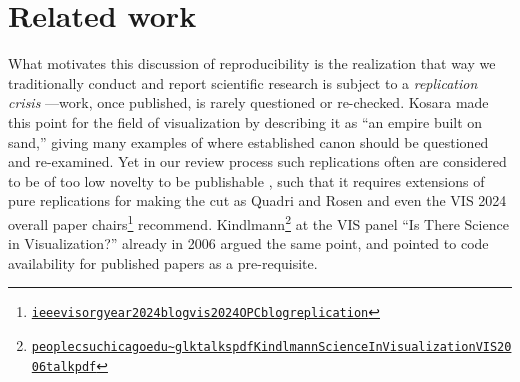 \documentclass[conference]{vgtc}                     %
\begin{document}
\section{Related work}
\label{sec:rw}

What motivates this discussion of reproducibility is the realization that way we traditionally conduct and report scientific research is subject to a \emph{replication crisis} \cite{Kosara:2018:SRC,Cockburn:2020:TRC}---work, once published, is rarely questioned or re-checked. Kosara \cite{Kosara:2016:EBS} made this point for the field of visualization by describing it as ``an empire built on sand,'' giving many examples of where established canon should be questioned and re-examined. Yet in our review process such replications often are considered to be of too low novelty to be publishable \cite{Quadri:2019:YCP}, such that it requires extensions of pure replications for making the cut as Quadri and Rosen \cite{Quadri:2019:YCP} and even the VIS 2024 overall paper chairs\footnote{\href{https://ieeevis.org/year/2024/blog/vis-2024-OPC-blog-replication}{\texttt{ieeevisorg\discretionary{/}{}{/}year\discretionary{/}{}{/}2024\discretionary{/}{}{/}blog\discretionary{/}{}{/}vis\discretionary{}{-}{-}2024\discretionary{}{-}{-}OPC\discretionary{}{-}{-}blog\discretionary{}{-}{-}replication}}} recommend. Kindlmann\footnote{\href{https://people.cs.uchicago.edu/~glk/talks/pdf/Kindlmann-ScienceInVisualization-VIS-2006-talk.pdf}{\texttt{peoplecsuchicagoedu\discretionary{/}{}{/}\~{}glk\discretionary{/}{}{/}talks\discretionary{/}{}{/}pdf\discretionary{/}{}{/}Kindlmann\discretionary{}{-}{-}ScienceInVisualization\discretionary{}{-}{-}VIS\discretionary{}{-}{-}2006\discretionary{}{-}{-}talkpdf}}} at the VIS panel ``Is There Science in Visualization?'' already in 2006 argued the same point, and pointed to code availability for published papers as a pre-requisite.
\end{document}
